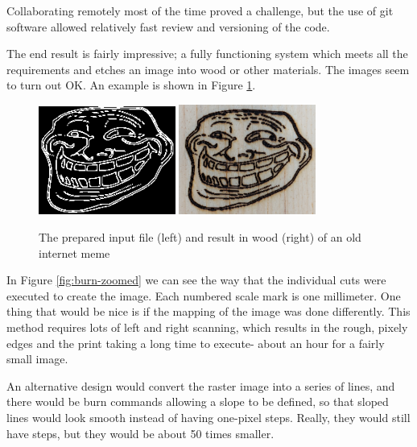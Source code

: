 \documentclass[11pt]{LaTeX-Classes/math-hw}
\begin{document}
Collaborating remotely most of the time proved a challenge, but the use of git software allowed
relatively fast review and versioning of the code.

The end result is fairly impressive; a fully functioning system which meets all the requirements
and etches an image into wood or other materials.
The images seem to turn out OK. An example is shown in Figure \ref{fig:troll-print}.
\begin{figure}[H]
  \begin{center}
    \includegraphics[width=0.4\textwidth]{trollface-edges}
    \includegraphics[width=0.4\textwidth]{trollface-result}
    \caption{The prepared input file (left) and result in wood (right) of an old internet meme}
    \label{fig:troll-print}
  \end{center}
\end{figure}

In Figure \ref{fig:burn-zoomed} we can see the way that the individual cuts were executed to
create the image.
Each numbered scale mark is one millimeter.
One thing that would be nice is if the mapping of the image was done differently.
This method requires lots of left and right scanning, which results in the rough, pixely edges
and the print taking a long time to execute- about an hour for a fairly small image.

An alternative design would convert the raster image into a series of lines,
and there would be burn commands allowing a slope to be defined, so that
sloped lines would look smooth instead of having one-pixel steps.
Really, they would still have steps, but they would be about 50 times smaller.
\end{document}

